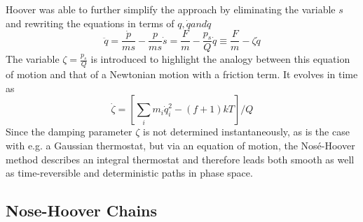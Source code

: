 Hoover was able to further simplify the approach by eliminating the variable $s$ and rewriting the equations in terms of $q, \dot{q} and \ddot{q}$
\begin{equation}
\ddot{q} = \frac{\dot{p}}{m s} - \frac{p}{m s}\dot{s} = \frac{F}{m} - \frac{p_s}{Q}\dot{q} \equiv \frac{F}{m} - \zeta \dot{q}
\end{equation} 
The variable $\zeta = \frac{p_s}{Q}$ is introduced to highlight the analogy between this equation of motion and that of a Newtonian motion with a friction term. It evolves in time as
\begin{equation}
\dot{\zeta} = \left[\sum_i m_i \dot{q}^2_i - (f+1)kT\right]/Q
\end{equation}
Since the damping parameter $\zeta$ is not determined instantaneously, as is the case with e.g. a Gaussian thermostat, but via an equation of motion, the Nosé-Hoover method describes an integral thermostat and therefore leads both smooth as well as time-reversible and deterministic paths in phase space.  

\subsection{Nose-Hoover Chains}


